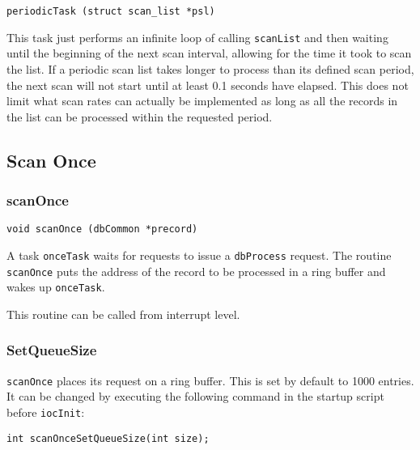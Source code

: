 \begin{verbatim}
periodicTask (struct scan_list *psl)
\end{verbatim}

This task just performs an infinite loop of calling \verb|scanList| and then waiting until the beginning of the next scan interval, allowing for the time it took to scan the list.
If a periodic scan list takes longer to process than its defined scan period, the next scan will not start until at least 0.1 seconds have elapsed.
This does not limit what scan rates can actually be implemented as long as all the records in the list can be processed within the requested period.

\subsection{Scan Once}

\subsubsection{scanOnce}

\begin{verbatim}
void scanOnce (dbCommon *precord)
\end{verbatim}

A task \verb|onceTask| waits for requests to issue a \verb|dbProcess| request.
The routine \verb|scanOnce| puts the address of the record to be processed in a ring buffer and wakes up \verb|onceTask|.

This routine can be called from interrupt level.

\subsubsection{SetQueueSize}

\verb|scanOnce| places its request on a ring buffer.
This is set by default to 1000 entries.
It can be changed by executing the following command in the startup script before \verb|iocInit|:

\begin{verbatim}
int scanOnceSetQueueSize(int size);
\end{verbatim}


